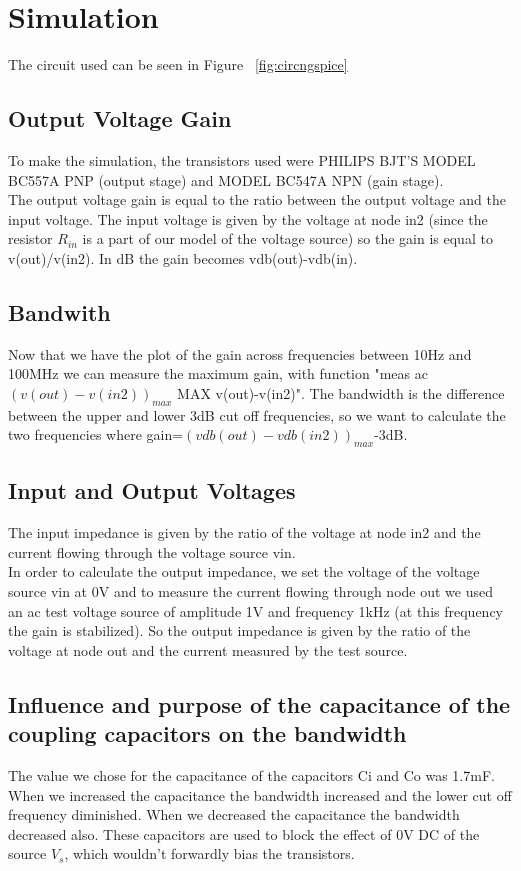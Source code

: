 \section{Simulation}
The circuit used can be seen in Figure ~\ref{fig:circngspice}
\subsection{Output Voltage Gain}
To make the simulation, the transistors used were PHILIPS BJT'S MODEL BC557A PNP (output stage) and MODEL BC547A NPN (gain stage). \\
The output voltage gain is equal to the ratio between the output voltage and the input voltage. The input voltage is given by the voltage at node in2 (since the resistor $R_{in}$ is a part of our model of the voltage source) so the gain is equal to v(out)/v(in2). In dB the gain becomes vdb(out)-vdb(in).
\subsection{Bandwith}
Now that we have the plot of the gain across frequencies between 10Hz and 100MHz we can measure the maximum gain, with function "meas ac $(v(out)-v(in2))_{max}$ MAX v(out)-v(in2)". The bandwidth is the difference between the upper and lower 3dB cut off frequencies, so we want to calculate the two frequencies where gain=$(vdb(out)-vdb(in2))_{max}$-3dB. 

\subsection{Input and Output Voltages}
The input impedance is given by the ratio of the voltage at node in2 and the current flowing through the voltage source vin. \\
In order to calculate the output impedance, we set the voltage of the voltage source vin at 0V and to measure the current flowing through node out we used an ac test voltage source of amplitude 1V and frequency 1kHz (at this frequency the gain is stabilized). So the output impedance is given by the ratio of the voltage at node out and the current measured by the test source. 

\subsection{Influence and purpose of the capacitance of the coupling capacitors on the bandwidth}
The value we chose for the capacitance of the capacitors Ci and Co was 1.7mF. When we increased the capacitance the bandwidth increased and the lower cut off frequency diminished. When we decreased the capacitance the bandwidth decreased also. These capacitors are used to block the effect of 0V DC of the source $V_s$, which wouldn't forwardly bias the transistors. 

